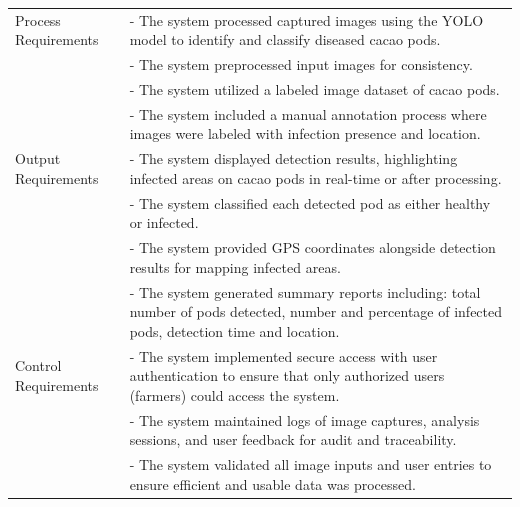 \begin{longtable}{p{4cm} p{8cm}}
	Process Requirements     & - The system processed captured images using the YOLO model to identify and classify diseased cacao pods.                                                                                                            \\
	& - The system preprocessed input images for consistency.                                                                                                                                                              \\
	& - The system utilized a labeled image dataset of cacao pods.                                                                                                                                                         \\
	& - The system included a manual annotation process where images were labeled with infection presence and location.                                                                                                   \\
	\midrule
	
	Output Requirements      & - The system displayed detection results, highlighting infected areas on cacao pods in real-time or after processing.                                                                                               \\
	& - The system classified each detected pod as either healthy or infected.                                                                                                                                             \\
	& - The system provided GPS coordinates alongside detection results for mapping infected areas.                                                                                                                       \\
	& - The system generated summary reports including: total number of pods detected, number and percentage of infected pods, detection time and location.                                                               \\
	\midrule
	
	Control Requirements     & - The system implemented secure access with user authentication to ensure that only authorized users (farmers) could access the system.                                                                              \\
	& - The system maintained logs of image captures, analysis sessions, and user feedback for audit and traceability.                                                                                                    \\
	& - The system validated all image inputs and user entries to ensure efficient and usable data was processed.                                                                                                          \\
	\midrule
	

\end{longtable}
